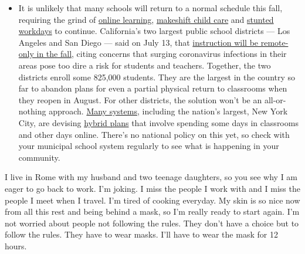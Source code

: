 \begin{itemize}
  \begin{itemize}
  \tightlist
  \item
    It is unlikely that many schools will return to a normal schedule
    this fall, requiring the grind of
    \href{https://www.nytimes.com/2020/06/05/us/coronavirus-education-lost-learning.html?action=click\&pgtype=Article\&state=default\&region=MAIN_CONTENT_3\&context=storylines_faq}{online
    learning},
    \href{https://www.nytimes.com/2020/05/29/us/coronavirus-child-care-centers.html?action=click\&pgtype=Article\&state=default\&region=MAIN_CONTENT_3\&context=storylines_faq}{makeshift
    child care} and
    \href{https://www.nytimes.com/2020/06/03/business/economy/coronavirus-working-women.html?action=click\&pgtype=Article\&state=default\&region=MAIN_CONTENT_3\&context=storylines_faq}{stunted
    workdays} to continue. California's two largest public school
    districts --- Los Angeles and San Diego --- said on July 13, that
    \href{https://www.nytimes.com/2020/07/13/us/lausd-san-diego-school-reopening.html?action=click\&pgtype=Article\&state=default\&region=MAIN_CONTENT_3\&context=storylines_faq}{instruction
    will be remote-only in the fall}, citing concerns that surging
    coronavirus infections in their areas pose too dire a risk for
    students and teachers. Together, the two districts enroll some
    825,000 students. They are the largest in the country so far to
    abandon plans for even a partial physical return to classrooms when
    they reopen in August. For other districts, the solution won't be an
    all-or-nothing approach.
    \href{https://bioethics.jhu.edu/research-and-outreach/projects/eschool-initiative/school-policy-tracker/}{Many
    systems}, including the nation's largest, New York City, are
    devising
    \href{https://www.nytimes.com/2020/06/26/us/coronavirus-schools-reopen-fall.html?action=click\&pgtype=Article\&state=default\&region=MAIN_CONTENT_3\&context=storylines_faq}{hybrid
    plans} that involve spending some days in classrooms and other days
    online. There's no national policy on this yet, so check with your
    municipal school system regularly to see what is happening in your
    community.
  \end{itemize}
\end{itemize}

I live in Rome with my husband and two teenage daughters, so you see why
I am eager to go back to work. I'm joking. I miss the people I work with
and I miss the people I meet when I travel. I'm tired of cooking
everyday. My skin is so nice now from all this rest and being behind a
mask, so I'm really ready to start again. I'm not worried about people
not following the rules. They don't have a choice but to follow the
rules. They have to wear masks. I'll have to wear the mask for 12 hours.

